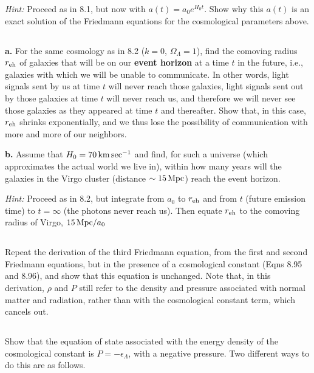 \documentclass[12pt]{article}
\begin{document}
\textit{Hint:} Proceed as in 8.1, but now with \(a(t) = a_0e^{H_0t}\). Show why this \(a(t)\) is an exact solution of the Friedmann equations for the cosmological parameters above.

\subsection{} %

\textbf{a.} For the same cosmology as in 8.2 (\(k=0\), \(\Omega_\Lambda = 1\)), find the comoving radius \(r_\mathrm{eh}\) of galaxies that will be on our \textbf{event horizon} at a time \(t\) in the future, i.e., galaxies with which we will be unable to communicate. In other words, light signals sent by us at time \(t\) will never reach those galaxies, light signals sent out by those galaxies at time \(t\) will never reach us, and therefore we will never see those galaxies as they appeared at time \(t\) and thereafter. Show that, in this case, \(r_\mathrm{eh}\) shrinks exponentially, and we thus lose the possibility of communication with more and more of our neighbors.

\textbf{b.} Assume that \(H_0 = 70\, \mathrm{km}\sec^{-1}\) and find, for such a universe (which approximates the actual world we live in), within how many years will the galaxies in the Virgo cluster (distance  \(\sim 15\, \mathrm{Mpc}\)) reach the event horizon.

\textit{Hint:} Proceed as in 8.2, but integrate from \(a_0\) to \(r_\mathrm{eh}\) and from \(t\) (future emission time)  to \(t = \infty\) (the photons never reach us). Then equate \(r_\mathrm{eh}\) to the comoving radius of Virgo, \( 15\,\mathrm{Mpc}/a_0\)

\subsection{} %

Repeat the derivation of the third Friedmann equation, from the first and second Friedmann equations, but in the presence of a cosmological constant (Eqns 8.95 and 8.96), and show that this equation is unchanged. Note that, in this derivation, \(\rho\) and \(P\) still refer to the density and pressure associated with normal matter and radiation, rather than with the cosmological constant term, which cancels out.

\subsection{} %

Show that the equation of state associated with the energy density of the cosmological constant is \(P = -\epsilon_\Lambda\), with a negative pressure. Two different ways to do this are as follows. \newline
\end{document}
